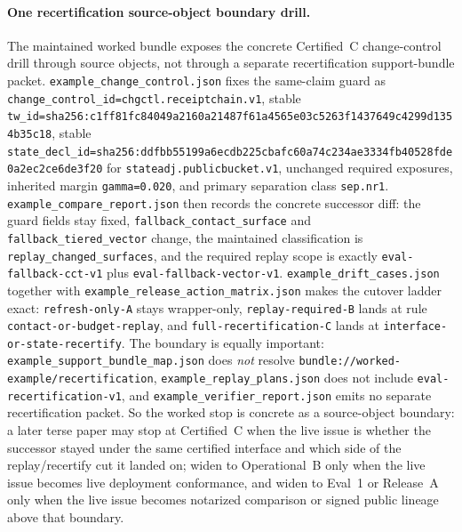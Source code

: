 \documentclass[11pt]{article}
\begin{document}
\paragraph{One recertification source-object boundary drill.}
The maintained worked bundle exposes the concrete Certified~C change-control drill through source objects, not through a separate recertification support-bundle packet.
\nolinkurl{example\_change\_control.json} fixes the same-claim guard as \nolinkurl{change\_control\_id=chgctl.receiptchain.v1}, stable \nolinkurl{tw\_id=sha256:c1ff81fc84049a2160a21487f61a4565e03c5263f1437649c4299d1354b35c18}, stable \nolinkurl{state\_decl\_id=sha256:ddfbb55199a6ecdb225cbafc60a74c234ae3334fb40528fde0a2ec2ce6de3f20} for \nolinkurl{stateadj.publicbucket.v1}, unchanged required exposures, inherited margin \nolinkurl{gamma=0.020}, and primary separation class \nolinkurl{sep.nr1}.
\nolinkurl{example\_compare\_report.json} then records the concrete successor diff: the guard fields stay fixed, \nolinkurl{fallback\_contact\_surface} and \nolinkurl{fallback\_tiered\_vector} change, the maintained classification is \nolinkurl{replay\_changed\_surfaces}, and the required replay scope is exactly \nolinkurl{eval-fallback-cct-v1} plus \nolinkurl{eval-fallback-vector-v1}.
\nolinkurl{example\_drift\_cases.json} together with \nolinkurl{example\_release\_action\_matrix.json} makes the cutover ladder exact: \nolinkurl{refresh-only-A} stays wrapper-only, \nolinkurl{replay-required-B} lands at rule \nolinkurl{contact-or-budget-replay}, and \nolinkurl{full-recertification-C} lands at \nolinkurl{interface-or-state-recertify}.
The boundary is equally important: \nolinkurl{example\_support\_bundle\_map.json} does \emph{not} resolve \nolinkurl{bundle://worked-example/recertification}, \nolinkurl{example\_replay\_plans.json} does not include \nolinkurl{eval-recertification-v1}, and \nolinkurl{example\_verifier\_report.json} emits no separate recertification packet.
So the worked stop is concrete as a source-object boundary: a later terse paper may stop at Certified~C when the live issue is whether the successor stayed under the same certified interface and which side of the replay/recertify cut it landed on; widen to Operational~B only when the live issue becomes live deployment conformance, and widen to Eval~1 or Release~A only when the live issue becomes notarized comparison or signed public lineage above that boundary.\cite{series:recert,series:operationalB,series:eval1,series:releaseA}
\end{document}
